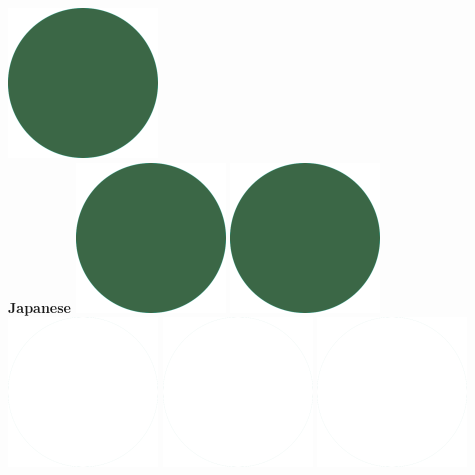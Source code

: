 \documentclass[]{friggeri-cv_reccius-experiment}
\begin{document}
\begin{below1}
    \includegraphics[scale=0.11]{img/IPSGreenDots.png}\\
    \belowspace
    \textbf{Japanese}\hfill
    \includegraphics[scale=0.11]{img/IPSGreenDots.png}
    \includegraphics[scale=0.11]{img/IPSGreenDots.png}
    \includegraphics[scale=0.11]{img/WhiteDots.png}
    \includegraphics[scale=0.11]{img/WhiteDots.png}
    \includegraphics[scale=0.11]{img/WhiteDots.png}

\end{below1}
\end{document}
